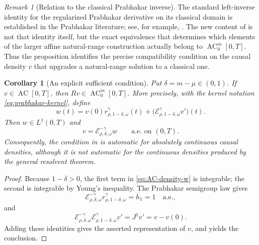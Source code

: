 \documentclass[11pt]{article}
\numberwithin{equation}{section}
\newtheorem{corollary}{Corollary}
\theoremstyle{definition}
\theoremstyle{remark}
\newtheorem{remark}{Remark}
\newcommand{\E}{\mathcal E}
\newcommand{\AC}{\operatorname{AC}}
\begin{document}
\begin{remark}[Relation to the classical Prabhakar inverse]
The standard left-inverse identity for the regularized Prabhakar derivative on its classical domain is established in the Prabhakar literature; see, for example, \cite{Giusti2020}. The new content of  is not that identity itself, but the exact equivalence that determines which elements of the larger affine natural-range construction actually belong to $\AC_0^m[0,T]$. Thus the proposition identifies the precise compatibility condition on the causal density $v$ that upgrades a natural-range solution to a classical one.
\end{remark}

\begin{corollary}[An explicit sufficient condition]\label{cor:AC-density}
Put $\delta=m-\mu\in(0,1)$. If $v\in\AC[0,T]$, then
$Rv\in\AC_0^m[0,T]$. More precisely, with the kernel notation
\eqref{eq:prabhakar-kernel}, define
\begin{equation}
w(t)=v(0)r_{\rho,1-\delta,\omega}^{\gamma}(t)
+\bigl(\E_{\rho,1-\delta,\omega}^{\gamma}v'\bigr)(t).
\label{eq:AC-density-w}
\end{equation}
Then $w\in L^1(0,T)$ and
\begin{equation*}
v=\E_{\rho,\delta,\omega}^{-\gamma}w
\qquad\text{a.e. on }(0,T).
\end{equation*}
Consequently, the condition in  is automatic for
absolutely continuous causal densities, although it is not automatic for the
continuous densities produced by the general resolvent theorem.
\end{corollary}

\begin{proof}
Because $1-\delta>0$, the first term in \eqref{eq:AC-density-w} is integrable;
the second is integrable by Young's inequality. The Prabhakar semigroup law
gives
\begin{equation*}
\E_{\rho,\delta,\omega}^{-\gamma}
r_{\rho,1-\delta,\omega}^{\gamma}=h_1=1
\quad\text{a.e.},
\end{equation*}
and
\begin{equation*}
\E_{\rho,\delta,\omega}^{-\gamma}
\E_{\rho,1-\delta,\omega}^{\gamma}v'
=J^1v'=v-v(0).
\end{equation*}
Adding these identities gives the asserted representation of $v$, and
 yields the conclusion.
\end{proof}
\end{document}

